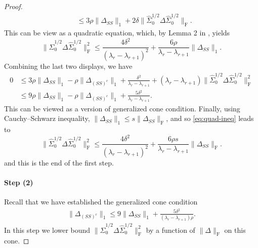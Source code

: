\documentclass[11pt]{article}
\newcommand{\nb}[1]{\textcolor{orange}{\texttt{[#1]}}}
\newcommand{\so}{\widehat{\Sigma}_0}
\newcommand{\0}{{\mathbf{0}}}
\begin{document}
\begin{proof}
\begin{align*}
    &\leq 3\rho\|\Delta_{SS}\|_1+2\delta\|\widehat{\Sigma}^{1/2}_0\Delta\widehat{\Sigma}^{1/2}_0\|_\mathrm{F}.
\end{align*}
This can be view as a quadratic equation, which, by Lemma 2 in \cite{cai2013sparse}, yields
\begin{equation}
      \label{eq:quad-ineq}
    \|\widehat{\Sigma}^{1/2}_0\Delta\widehat{\Sigma}^{1/2}_0\|_\mathrm{F}^2\leq \frac{4\delta^2}{(\lambda_r-\lambda_{r+1})^2}+\frac{6\rho}{\lambda_r-\lambda_{r+1}}\|\Delta_{SS}\|_1.
\end{equation}
Combining the last two displays, we have 
\begin{align*}
    0&\leq 3\rho\|\Delta_{SS}\|_1-\rho\|\Delta_{(SS)^c}\|_1+\frac{\delta^2}{\lambda_r-\lambda_{r+1}}+(\lambda_r-\lambda_{r+1})\|\so^{1/2}\Delta\so^{1/2}\|_\mathrm{F}^2\\
    &\leq  9\rho\|\Delta_{SS}\|_1-\rho\|\Delta_{(SS)^c}\|_1+\frac{5\delta^2}{\lambda_r-\lambda_{r+1}}.
\end{align*}
This can be viewed as a version of generalized cone condition. Finally, using Cauchy--Schwarz inequality, $\|\Delta_{SS}\|_1\leq s \|\Delta_{SS}\|_\mathrm{F}$, and so \eqref{eq:quad-ineq} leads to
\begin{equation}
      \label{eq:Delta-bd-1}
    \|\widehat{\Sigma}^{1/2}_0\Delta\widehat{\Sigma}^{1/2}_0\|_\mathrm{F}^2\leq \frac{4\delta^2}{(\lambda_r-\lambda_{r+1})^2}+\frac{6\rho s}{\lambda_r-\lambda_{r+1}}\|\Delta_{SS}\|_\mathrm{F}.
\end{equation}
and this is the end of the first step.

\paragraph{Step (2)}
Recall that we have established the {generalized cone condition} 
\begin{align}
      \label{eq:generalized-cone}
   \|\Delta_{(SS)^c}\|_1\leq 9\|\Delta_{SS}\|_1+\frac{5\delta^2}{(\lambda_r-\lambda_{r+1})\rho}.
\end{align}
In this step we lower bound $\|\widehat{\Sigma}^{1/2}_0\Delta\widehat{\Sigma}^{1/2}_0\|_\mathrm{F}^2$ by a function of $\|\Delta\|_\mathrm{F}$ on this cone. 


\end{proof}
\end{document}

